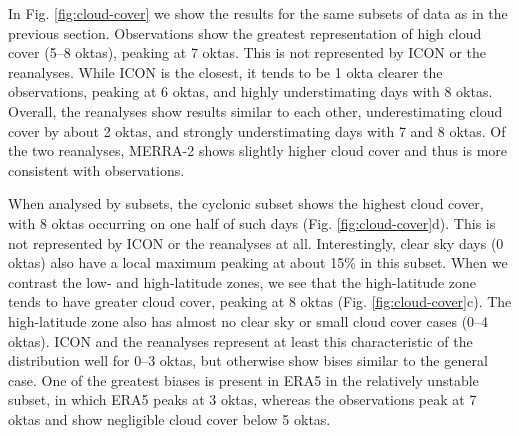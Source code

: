 \documentclass[12pt,a4paper]{article}
\begin{document}
In Fig.  \ref{fig:cloud-cover} we show the results for the same subsets of data
as in the previous section. Observations show the greatest representation of
high cloud cover (5--8 oktas), peaking at 7 oktas. This is not represented by
ICON or the reanalyses.  While ICON is the closest, it tends to be 1 okta
clearer the observations, peaking at 6 oktas, and highly understimating days
with 8 oktas.  Overall, the reanalyses show results similar to each other,
underestimating cloud cover by about 2 oktas, and strongly understimating days
with 7 and 8 oktas. Of the two reanalyses, MERRA-2 shows slightly higher cloud
cover and thus is more consistent with observations.

When analysed by subsets, the cyclonic subset shows the highest cloud cover,
with 8 oktas occurring on one half of such days (Fig. \ref{fig:cloud-cover}d).
This is not represented by ICON or the reanalyses at all. Interestingly, clear
sky days (0 oktas) also have a local maximum peaking at about 15\% in this
subset.  When we contrast the low- and high-latitude zones, we see that the
high-latitude zone tends to have greater cloud cover, peaking at 8 oktas (Fig.
\ref{fig:cloud-cover}c). The high-latitude zone also has almost no clear sky or
small cloud cover cases (0--4 oktas). ICON and the reanalyses represent at
least this characteristic of the distribution well for 0--3 oktas, but
otherwise show bises similar to the general case. One of the greatest biases is
present in ERA5 in the relatively unstable subset, in which ERA5 peaks at 3
oktas, whereas the observations peak at 7 oktas and show negligible cloud cover
below 5 oktas.
\end{document}
